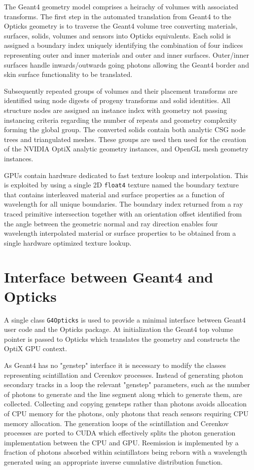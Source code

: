 \documentclass{webofc}
\begin{document}
The Geant4 geometry model comprises a heirachy of volumes with associated transforms. The first step in 
the automated translation from Geant4 to the Opticks geometry is to traverse the Geant4 volume tree converting 
materials, surfaces, solids, volumes and sensors into Opticks equivalents. Each solid is assigned 
a boundary index uniquely identifying the combination of four indices representing outer and inner materials and outer and inner surfaces.
Outer/inner surfaces handle inwards/outwards going photons allowing the Geant4 border and skin
surface functionality to be translated. 

Subsequently repeated groups of volumes and their placement transforms are identified using node digests of progeny transforms and solid identities.
All structure nodes are assigned an instance index with geometry not passing instancing criteria regarding the number of repeats 
and geometry complexity forming the global group. The converted solids contain both analytic CSG node trees and triangulated meshes.   
These groups are used then used for the creation of the NVIDIA OptiX analytic geometry instances, and OpenGL mesh geometry instances.  

GPUs contain hardware dedicated to fast texture lookup and interpolation.
This is exploited by using a single 2D {\tt float4} texture named the boundary texture
that contains interleaved material and surface properties as a function of wavelength for all
unique boundaries.
The boundary index returned from a ray traced primitive intersection together with
an orientation offset identified from the angle between the geometric normal and ray direction
enables four wavelength interpolated material or surface properties to be
obtained from a single hardware optimized texture lookup.
%
\section{Interface between Geant4 and Opticks}
\label{simulation}
%
A single class {\tt G4Opticks} is used to provide a 
minimal interface between Geant4 user code and 
the Opticks package. 
At initialization the Geant4 top volume pointer is
passed to Opticks which translates the geometry and constructs 
the OptiX GPU context.

As Geant4 has no "genstep" interface it is necessary to modify the 
classes representing scintillation and Cerenkov processes.
Instead of generating photon secondary tracks in a loop the relevant "genstep" parameters, 
such as the number of photons to generate and the line segment along which to generate them, 
are collected. Collecting and copying gensteps rather than photons avoids allocation of CPU memory
for the photons, only photons that reach sensors requiring CPU memory allocation.
The generation loops of the scintillation and Cerenkov processes are ported to CUDA 
which effectively splits the photon generation implementation between the CPU and GPU.
Reemission is implemented by a fraction of photons absorbed within scintillators being 
reborn with a wavelength generated using an appropriate inverse cumulative distribution function.  
\end{document}
